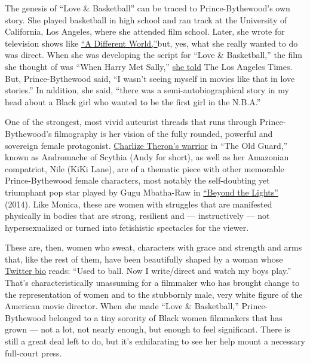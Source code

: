 The genesis of ``Love \& Basketball'' can be traced to
Prince-Bythewood's own story. She played basketball in high school and
ran track at the University of California, Los Angeles, where she
attended film school. Later, she wrote for television shows like
\href{https://ew.com/tv/a-different-world-where-are-they-now/}{``A
Different World,''}but, yes, what she really wanted to do was direct.
When she was developing the script for ``Love \& Basketball,'' the film
she thought of was ``When Harry Met Sally,''
\href{https://www.latimes.com/entertainment-arts/movies/story/2020-04-21/love-and-basketball-oral-history-20-year-anniversary}{she
told} The Los Angeles Times. But, Prince-Bythewood said, ``I wasn't
seeing myself in movies like that in love stories.'' In addition, she
said, ``there was a semi-autobiographical story in my head about a Black
girl who wanted to be the first girl in the N.B.A.''

One of the strongest, most vivid auteurist threads that runs through
Prince-Bythewood's filmography is her vision of the fully rounded,
powerful and sovereign female protagonist.
\href{https://www.nytimes.com/by/jason-bailey}{Charlize Theron's
warrior} in ``The Old Guard,'' known as Andromache of Scythia (Andy for
short), as well as her Amazonian compatriot, Nile (KiKi Lane), are of a
thematic piece with other memorable Prince-Bythewood female characters,
most notably the self-doubting yet triumphant pop star played by Gugu
Mbatha-Raw in
\href{https://www.nytimes.com/2014/11/14/movies/beyond-the-lights-a-divas-romance.html}{``Beyond
the Lights''} (2014). Like Monica, these are women with struggles that
are manifested physically in bodies that are strong, resilient and ---
instructively --- not hypersexualized or turned into fetishistic
spectacles for the viewer.

These are, then, women who sweat, characters with grace and strength and
arms that, like the rest of them, have been beautifully shaped by a
woman whose
\href{https://twitter.com/GPBmadeit?ref_src=twsrc\%5Egoogle\%7Ctwcamp\%5Eserp\%7Ctwgr\%5Eauthor}{Twitter
bio} reads: ``Used to ball. Now I write/direct and watch my boys play.''
That's characteristically unassuming for a filmmaker who has brought
change to the representation of women and to the stubbornly male, very
white figure of the American movie director. When she made ``Love \&
Basketball,'' Prince-Bythewood belonged to a tiny sorority of Black
women filmmakers that has grown --- not a lot, not nearly enough, but
enough to feel significant. There is still a great deal left to do, but
it's exhilarating to see her help mount a necessary full-court press.

